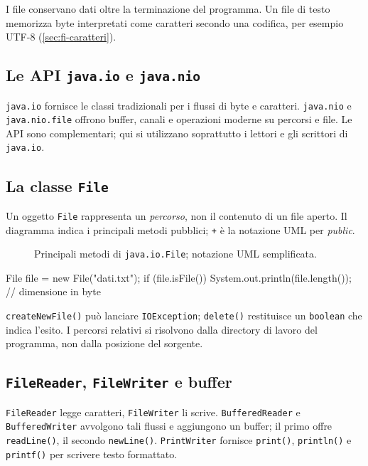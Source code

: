 I file conservano dati oltre la terminazione del programma.
Un file di testo memorizza byte interpretati come caratteri
secondo una codifica, per esempio UTF-8
(\cref{sec:fi-caratteri}).

\subsection{Le API \texttt{java.io} e \texttt{java.nio}}
\label{sec:fi-java-file-io-nio}

\texttt{java.io} fornisce le classi tradizionali per i flussi di
byte e caratteri. \texttt{java.nio} e \texttt{java.nio.file}
offrono buffer, canali e operazioni moderne su percorsi e file.
Le API sono complementari; qui si utilizzano soprattutto i
lettori e gli scrittori di \texttt{java.io}.

\subsection{La classe \texttt{File}}
\label{sec:fi-java-file-classe-file}

Un oggetto \texttt{File} rappresenta un \emph{percorso}, non il
contenuto di un file aperto. Il diagramma indica i principali
metodi pubblici; \texttt{+} è la notazione UML per \emph{public}.

\begin{figure}[htbp]
  \centering
  
  \caption{Principali metodi di \texttt{java.io.File};
  notazione UML semplificata.}
  \label{fig:fi-java-file-uml-file}
\end{figure}

\begin{unipdcode}[language=Java]
File file = new File("dati.txt");
if (file.isFile()) {
    System.out.println(file.length()); // dimensione in byte
}
\end{unipdcode}

\texttt{createNewFile()} può lanciare \texttt{IOException};
\texttt{delete()} restituisce un \texttt{boolean} che indica
l'esito. I percorsi relativi si risolvono dalla directory di
lavoro del programma, non dalla posizione del sorgente.

\subsection{\texttt{FileReader}, \texttt{FileWriter} e buffer}
\label{sec:fi-java-file-classi-flussi}

\texttt{FileReader} legge caratteri, \texttt{FileWriter} li
scrive. \texttt{BufferedReader} e \texttt{BufferedWriter}
avvolgono tali flussi e aggiungono un buffer; il primo offre
\texttt{readLine()}, il secondo \texttt{newLine()}.
\texttt{PrintWriter} fornisce \texttt{print()}, \texttt{println()}
e \texttt{printf()} per scrivere testo formattato.

